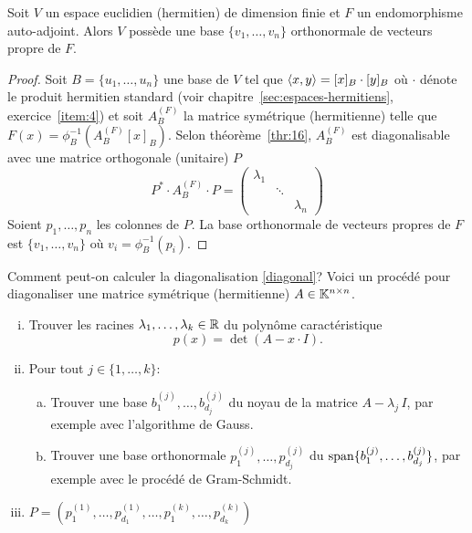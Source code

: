 \begin{corollary}
  \label{co:8}
  Soit $V$ un espace euclidien (hermitien) de dimension finie et $F$ un endomorphisme auto-adjoint. Alors $V$ possède une base $\{v_1,\dots,v_n\}$ orthonormale de vecteurs propre de $F$. 
\end{corollary}

\begin{proof}
  Soit $B = \{u_1,\dots,u_n\}$ une base de $V$ tel que $\langle {x,y} \rangle = [x]_B \cdot [y]_B$ où $\cdot $ dénote le produit hermitien standard (voir chapitre~\ref{sec:espaces-hermitiens}, exercice~\ref{item:4}) et soit $A_B^{(F)}$  la matrice symétrique (hermitienne) telle que $F(x)  = \phi_B^{-1}(A_B^{(F)} [x]_B)$. Selon théorème~\ref{thr:16}, $A_B^{(F)}$ est diagonalisable avec une matrice orthogonale (unitaire) $P$ 
  \begin{displaymath}
    P^* \cdot 
    A_B^{(F)} \cdot  P  = \begin{pmatrix}
      \lambda_1 \\
      & \ddots \\
      & & \lambda_n
    \end{pmatrix}
  \end{displaymath}
 Soient $p_1,\dots,p_n$  les colonnes de $P$. La base orthonormale de vecteurs propres de $F$ est $\{v_1,\dots,v_n\}$ où $v_i = \phi_B^{-1}(p_i)$. 
\end{proof}



Comment peut-on calculer la diagonalisation \eqref{diagonal}? Voici un procédé pour diagonaliser une matrice symétrique (hermitienne) $A \in \mathbb{K}^{n \times n}$. 

\begin{enumerate}[i)] 
\item Trouver les racines $\lambda_1,\dots,\lambda_k \in \mathbb{R}$ du polynôme caractéristique 
  \begin{displaymath}
    p(x) = \det(A - x\cdot I). 
  \end{displaymath}
\item Pour tout $j \in \{1,\dots,k\}$:
  \begin{enumerate}[a)] 
  \item Trouver une base $b^{(j)}_1,\dots,b^{(j)}_{d_j}$ du noyau de la matrice $A - \lambda_j \, I$, par exemple avec l'algorithme de Gauss. 
  \item Trouver une base orthonormale $p^{(j)}_1,\dots,p^{(j)}_{d_j}$ du $\operatorname{span}\{b^{(j)}_1,\dots,b^{(j)}_{d_j}\}$, par exemple avec le procédé de Gram-Schmidt. 
  \end{enumerate}
  \item $P = \left(p^{(1)}_1,\dots,p^{(1)}_{d_1},\dots,p^{(k)}_1,\dots,p^{(k)}_{d_k}\right)$ 
\end{enumerate}




